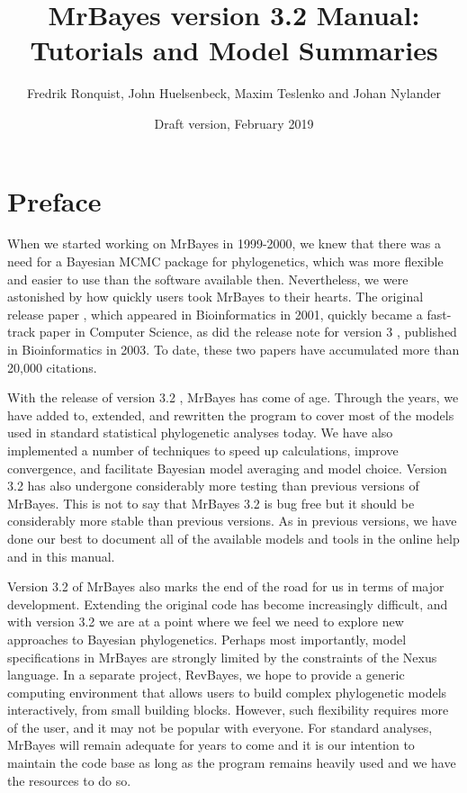 \documentclass[12pt]{book}
\begin{document}
\title{MrBayes version 3.2 Manual: Tutorials and Model Summaries}

\date{\large Draft version, February 2019}

\author{Fredrik Ronquist, John Huelsenbeck, Maxim Teslenko and Johan Nylander}

\maketitle

\tableofcontents

\newpage

\frontmatter

\chapter{Preface}
\label{preface}

When we started working on MrBayes in 1999-2000, we knew that there was a need for a Bayesian MCMC
package for phylogenetics, which was more flexible and easier to use than the software available
then. Nevertheless, we were astonished by how quickly users took MrBayes to their hearts. The
original release paper \citep{huelsenbeck01c}, which appeared in Bioinformatics in 2001, quickly
became a fast-track paper in Computer Science, as did the release note for version 3
\citep{ronquist03}, published in Bioinformatics in 2003. To date, these two papers have accumulated
more than 20,000 citations.

With the release of version 3.2 \citep{ronquist12a}, MrBayes has come of age. Through the years, we
have added to, extended, and rewritten the program to cover most of the models used in standard
statistical phylogenetic analyses today. We have also implemented a number of techniques to speed
up calculations, improve convergence, and facilitate Bayesian model averaging and model choice.
Version 3.2 has also undergone considerably more testing than previous versions of MrBayes.  This
is not to say that MrBayes 3.2 is bug free but it should be considerably more stable than previous
versions. As in previous versions, we have done our best to document all of the available models
and tools in the online help and in this manual. 

Version 3.2 of MrBayes also marks the end of the road for us in terms of major development.
Extending the original code has become increasingly difficult, and with version 3.2 we are at a
point where we feel we need to explore new approaches to Bayesian phylogenetics. Perhaps most
importantly, model specifications in MrBayes are strongly limited by the constraints of the Nexus
language. In a separate project, RevBayes, we hope to provide a generic computing environment that
allows users to build complex phylogenetic models interactively, from small building blocks.
However, such flexibility requires more of the user, and it may not be popular with everyone. For
standard analyses, MrBayes will remain adequate for years to come and it is our intention to
maintain the code base as long as the program remains heavily used and we have the resources to do
so.
\end{document}
